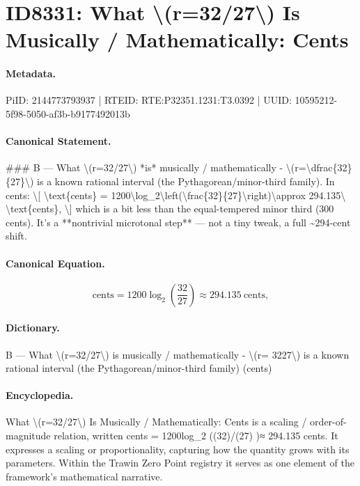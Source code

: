 \section*{ID8331: What \textbackslash{}(r=32/27\textbackslash{}) Is Musically / Mathematically: Cents}
\paragraph{Metadata.}
PiID: 2144773793937 | RTEID: RTE:P32351.1231:T3.0392 | UUID: 10595212-5f98-5050-af3b-b9177492013b

\paragraph{Canonical Statement.}
\#\#\# B — What \textbackslash{}(r=32/27\textbackslash{}) *is* musically / mathematically - \textbackslash{}(r=\textbackslash{}dfrac\{32\}\{27\}\textbackslash{}) is a known rational interval (the Pythagorean/minor-third family). In cents: \textbackslash{}[ \textbackslash{}text\{cents\} = 1200\textbackslash{}log\_2\textbackslash{}left(\textbackslash{}frac\{32\}\{27\}\textbackslash{}right)\textbackslash{}approx 294.135\textbackslash{} \textbackslash{}text\{cents\}, \textbackslash{}] which is a bit less than the equal-tempered minor third (300 cents). It’s a **nontrivial microtonal step** — not a tiny tweak, a full \textasciitilde{}294-cent shift.

\paragraph{Canonical Equation.}
\[
\text{cents} = 1200\log_2\left(\frac{32}{27}\right)\approx 294.135\ \text{cents},
\]

\paragraph{Dictionary.}
B — What \textbackslash{}(r=32/27\textbackslash{}) is musically / mathematically - \textbackslash{}(r= 3227\textbackslash{}) is a known rational interval (the Pythagorean/minor-third family) (cents)

\paragraph{Encyclopedia.}
What \textbackslash{}(r=32/27\textbackslash{}) Is Musically / Mathematically: Cents is a scaling / order-of-magnitude relation, written cents = 1200log\_2 ((32)/(27) )≈ 294.135 cents. It expresses a scaling or proportionality, capturing how the quantity grows with its parameters. Within the Trawin Zero Point registry it serves as one element of the framework's mathematical narrative.
